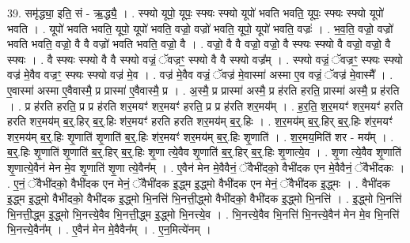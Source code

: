 \documentclass[17pt]{extarticle}
\begin{document}
39. समृ॑द्ध्या॒ इति॒ सं - ऋ॒द्ध्यै॒ । . स्फ्यो यूपो॒ यूपः॒ स्फ्यः स्फ्यो यूपो॑ भवति भवति॒ यूपः॒ स्फ्यः स्फ्यो यूपो॑ भवति । . यूपो॑ भवति भवति॒ यूपो॒ यूपो॑ भवति॒ वज्रो॒ वज्रो॑ भवति॒ यूपो॒ यूपो॑ भवति॒ वज्रः॑ । . भ॒व॒ति॒ वज्रो॒ वज्रो॑ भवति भवति॒ वज्रो॒ वै वै वज्रो॑ भवति भवति॒ वज्रो॒ वै । . वज्रो॒ वै वै वज्रो॒ वज्रो॒ वै स्फ्यः स्फ्यो वै वज्रो॒ वज्रो॒ वै स्फ्यः । . वै स्फ्यः स्फ्यो वै वै स्फ्यो वज्रं॒ ॅवज्रꣳ॒॒ स्फ्यो वै वै स्फ्यो वज्र᳚म् । . स्फ्यो वज्रं॒ ॅवज्रꣳ॒॒ स्फ्यः स्फ्यो वज्र॑ मे॒वैव वज्रꣳ॒॒ स्फ्यः स्फ्यो वज्र॑ मे॒व । . वज्र॑ मे॒वैव वज्रं॒ ॅवज्र॑ मे॒वास्मा॑ अस्मा ए॒व वज्रं॒ ॅवज्र॑ मे॒वास्मै᳚ । . ए॒वास्मा॑ अस्मा ए॒वैवास्मै॒ प्र प्रास्मा॑ ए॒वैवास्मै॒ प्र । . अ॒स्मै॒ प्र प्रास्मा॑ अस्मै॒ प्र ह॑रति हरति॒ प्रास्मा॑ अस्मै॒ प्र ह॑रति । . प्र ह॑रति हरति॒ प्र प्र ह॑रति शर॒मयꣳ॑ शर॒मयꣳ॑ हरति॒ प्र प्र ह॑रति शर॒मय᳚म् । . ह॒र॒ति॒ श॒र॒मयꣳ॑ शर॒मयꣳ॑ हरति हरति शर॒मय॑म् ब॒र्॒.हिर् ब॒र्॒.हिः श॑र॒मयꣳ॑ हरति हरति शर॒मय॑म् ब॒र्॒.हिः । . श॒र॒मय॑म् ब॒र्॒.हिर् ब॒र्॒.हिः श॑र॒मयꣳ॑ शर॒मय॑म् ब॒र्॒.हिः शृ॒णाति॑ शृ॒णाति॑ ब॒र्॒.हिः श॑र॒मयꣳ॑ शर॒मय॑म् ब॒र्॒.हिः शृ॒णाति॑ । . श॒र॒मय॒मिति॑ शर - मय᳚म् । . ब॒र्॒.हिः शृ॒णाति॑ शृ॒णाति॑ ब॒र्॒.हिर् ब॒र्॒.हिः शृ॒णा त्ये॒वैव शृ॒णाति॑ ब॒र्॒.हिर् ब॒र्॒.हिः शृ॒णात्ये॒व । . शृ॒णा त्ये॒वैव शृ॒णाति॑ शृ॒णात्ये॒वैन॑ मेन मे॒व शृ॒णाति॑ शृ॒णा त्ये॒वैन᳚म् । . ए॒वैन॑ मेन मे॒वैवैनं॒ ॅवैभी॑दको॒ वैभी॑दक एन मे॒वैवैनं॒ ॅवैभी॑दकः । . ए॒नं॒ ॅवैभी॑दको॒ वैभी॑दक एन मेनं॒ ॅवैभी॑दक इ॒द्ध्म इ॒द्ध्मो वैभी॑दक एन मेनं॒ ॅवैभी॑दक इ॒द्ध्मः । . वैभी॑दक इ॒द्ध्म इ॒द्ध्मो वैभी॑दको॒ वैभी॑दक इ॒द्ध्मो भि॒नत्ति॑ भि॒नत्ती॒द्ध्मो वैभी॑दको॒ वैभी॑दक इ॒द्ध्मो भि॒नत्ति॑ । . इ॒द्ध्मो भि॒नत्ति॑ भि॒नत्ती॒द्ध्म इ॒द्ध्मो भि॒नत्त्ये॒वैव भि॒नत्ती॒द्ध्म इ॒द्ध्मो भि॒नत्त्ये॒व । . भि॒नत्त्ये॒वैव भि॒नत्ति॑ भि॒नत्त्ये॒वैन॑ मेन मे॒व भि॒नत्ति॑ भि॒नत्त्ये॒वैन᳚म् । . ए॒वैन॑ मेन मे॒वैवैन᳚म् । . ए॒न॒मित्ये॑नम् । \newline
\pagebreak
{}
\end{document}
